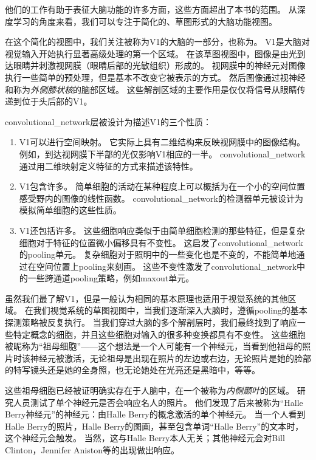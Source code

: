 他们的工作有助于表征大脑功能的许多方面，这些方面超出了本书的范围。
从深度学习的角度来看，我们可以专注于简化的、草图形式的大脑功能视图。

在这个简化的视图中，我们关注被称为V1的大脑的一部分，也称为。
V1是大脑对视觉输入开始执行显著高级处理的第一个区域。
在该草图视图中，图像是由光到达眼睛并刺激视网膜（眼睛后部的光敏组织）形成的。
视网膜中的神经元对图像执行一些简单的预处理，但是基本不改变它被表示的方式。
然后图像通过视神经和称为\emph{外侧膝状核}的脑部区域。 
这些解剖区域的主要作用是仅仅将信号从眼睛传递到位于头后部的V1。
 
 
\gls{convolutional_network}层被设计为描述V1的三个性质：
\begin{enumerate}
  \item V1可以进行空间映射。
  它实际上具有二维结构来反映视网膜中的图像结构。
  例如，到达视网膜下半部的光仅影响V1相应的一半。 
  \gls{convolutional_network}通过用二维映射定义特征的方式来描述该特性。

  \item V1包含许多。
  简单细胞的活动在某种程度上可以概括为在一个小的空间位置感受野内的图像的线性函数。
  \gls{convolutional_network}的检测器单元被设计为模拟简单细胞的这些性质。

  \item V1还包括许多。
  这些细胞响应类似于由简单细胞检测的那些特征，但是复杂细胞对于特征的位置微小偏移具有不变性。 
  这启发了\gls{convolutional_network}的\gls{pooling}单元。
  复杂细胞对于照明中的一些变化也是不变的，不能简单地通过在空间位置上\gls{pooling}来刻画。 
  这些不变性激发了\gls{convolutional_network}中的一些跨通道\gls{pooling}策略，例如maxout单元\citep{Goodfellow-et-al-ICML2013}。
\end{enumerate}

虽然我们最了解V1，但是一般认为相同的基本原理也适用于视觉系统的其他区域。
在我们视觉系统的草图视图中，当我们逐渐深入大脑时，遵循\gls{pooling}的基本探测策略被反复执行。
当我们穿过大脑的多个解剖层时，我们最终找到了响应一些特定概念的细胞，并且这些细胞对输入的很多种变换都具有不变性。
这些细胞被昵称为``祖母细胞''——这个想法是一个人可能有一个神经元，当看到他祖母的照片时该神经元被激活，无论祖母是出现在照片的左边或右边，无论照片是她的脸部的特写镜头还是她的全身照，也无论她处在光亮还是黑暗中，等等。

这些祖母细胞已经被证明确实存在于人脑中，在一个被称为\emph{内侧颞叶}的区域\citep{quiroga2005invariant}。
研究人员测试了单个神经元是否会响应名人的照片。
他们发现了后来被称为``Halle Berry神经元''的神经元：由Halle Berry的概念激活的单个神经元。
当一个人看到Halle Berry的照片，Halle Berry的图画，甚至包含单词``Halle Berry''的文本时，这个神经元会触发。
当然，这与Halle Berry本人无关；其他神经元会对Bill Clinton，Jennifer Aniston等的出现做出响应。
 
